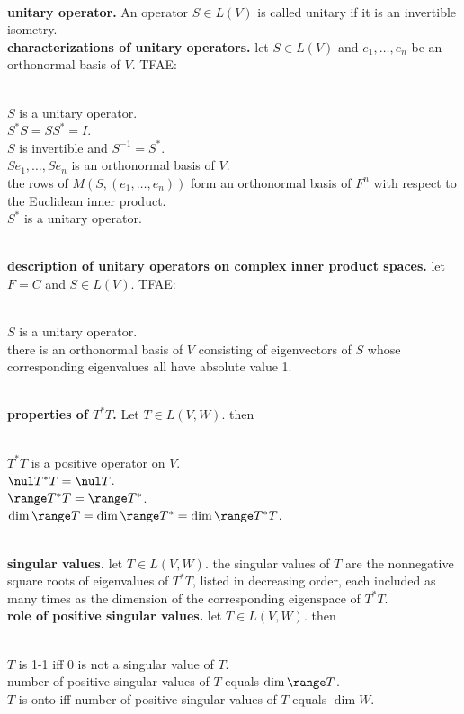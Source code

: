 	\\ \textbf{unitary operator. } An operator $S \in L(V)$ is called unitary if it is an invertible isometry. 
	\\ \textbf{characterizations of unitary operators. } let $S \in L(V)$ and $e_1,\dots,e_n$ be an orthonormal basis of $V$. TFAE: 
	\begin{enumerate}
		\\ $S$ is a unitary operator. 
		\\ $S^*S = SS^* = I$. 
		\\ $S$ is invertible and $S^{-1} = S^*$. 
		\\ $Se_1,\dots,Se_n$ is an orthonormal basis of $V$. 
		\\ the rows of $M(S,(e_1,\dots,e_n))$ form an orthonormal basis of $F^n$ with respect to the Euclidean inner product. 
		\\ $S^*$ is a unitary operator. 
	\end{enumerate}
	\\ \textbf{description of unitary operators on complex inner product spaces. } let $F=C$ and $S \in L(V)$. TFAE: 
	\begin{enumerate}
		\\ $S$ is a unitary operator. 
		\\ there is an orthonormal basis of $V$ consisting of eigenvectors of $S$ whose corresponding eigenvalues all have absolute value 1. 
	\end{enumerate}
	\\ \textbf{properties of $T^*T$. } Let $T \in L(V,W)$. then 
	\begin{enumerate} 
		\\ $T^*T$ is a positive operator on $V$. 
		\\ $\nul T^*T = \nul T$. 
		\\ $\range T^*T = \range T^*$. 
		\\ $\dim\range T = \dim\range T^* = \dim\range T^*T$. 
	\end{enumerate}
	\\ \textbf{singular values. } let $T \in L(V,W)$. the singular values of $T$ are the nonnegative square roots of eigenvalues of $T^*T$, listed in decreasing order, each included as many times as the dimension of the corresponding eigenspace of $T^*T$. 
	\\ \textbf{role of positive singular values. } let $T \in L(V,W)$. then 
	\begin{enumerate}
		\\ $T$ is 1-1 iff 0 is not a singular value of $T$. 
		\\ number of positive singular values of $T$ equals $\dim\range T$. 
		\\ $T$ is onto iff number of positive singular values of $T$ equals $\dim W$. 
	\end{enumerate}
